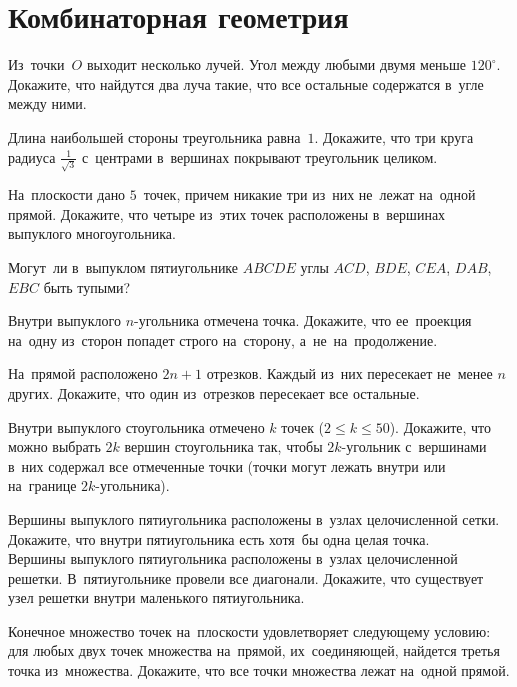 
\section*{Комбинаторная геометрия}


\begin{problems}

\item
Из~точки~$O$ выходит несколько лучей.
Угол между любыми двумя меньше $120^{\circ}$.
Докажите, что найдутся два луча такие, что все остальные содержатся в~угле
между ними.

\item
Длина наибольшей стороны треугольника равна~$1$.
Докажите, что три круга радиуса $\frac{1}{\sqrt{3}}$ с~центрами в~вершинах
покрывают треугольник целиком.

\item
На~плоскости дано $5$~точек, причем никакие три из~них не~лежат на~одной
прямой.
Докажите, что четыре из~этих точек расположены в~вершинах выпуклого
многоугольника.

\item
Могут~ли в~выпуклом пятиугольнике $ABCDE$ углы $ACD$, $BDE$, $CEA$, $DAB$,
$EBC$ быть тупыми?

\item
Внутри выпуклого $n$-угольника отмечена точка.
Докажите, что ее~проекция на~одну из~сторон попадет строго на~сторону,
а~не~на~продолжение.


\item
На~прямой расположено $2 n + 1$ отрезков.
Каждый из~них пересекает не~менее $n$ других.
Докажите, что один из~отрезков пересекает все остальные.

\item
Внутри выпуклого стоугольника отмечено $k$ точек ($2 \leq k \leq 50$).
Докажите, что можно выбрать $2 k$ вершин стоугольника так, чтобы $2 k$-угольник
с~вершинами в~них содержал все отмеченные точки (точки могут лежать внутри или
на~границе $2 k$-угольника).

\item
\sp
Вершины выпуклого пятиугольника расположены в~узлах целочисленной сетки.
Докажите, что внутри пятиугольника есть хотя~бы одна целая точка.
\\
\sp
Вершины выпуклого пятиугольника расположены в~узлах целочисленной решетки.
В~пятиугольнике провели все диагонали.
Докажите, что существует узел решетки внутри маленького пятиугольника.

\item
Конечное множество точек на~плоскости удовлетворяет следующему условию: для
любых двух точек множества на~прямой, их~соединяющей, найдется третья точка
из~множества.
Докажите, что все точки множества лежат на~одной прямой.

\end{problems}

